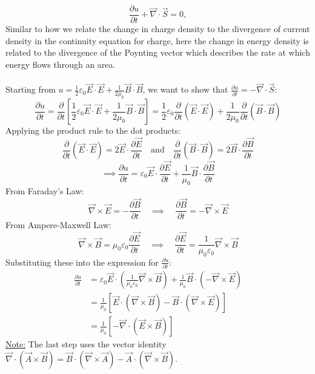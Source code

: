 \documentclass[12pt]{article}
\begin{document}
\[
\frac{\partial u}{\partial t} + \vec{\nabla} \cdot \vec{S} = 0,
\]
Similar to how we relate the change in charge density to the divergence of current density in the continuity equation for charge, here the change in energy density is related to the divergence of the Poynting vector which describes the rate at which energy flows through an area.\\\\
Starting from $u = \frac{1}{2} \varepsilon_0 \vec{E}\cdot\vec{E} + \frac{1}{2\mu_0} \vec{B}\cdot\vec{B}$, we want to show that $\frac{\partial u}{\partial t} =- \vec{\nabla} \cdot \vec{S}$:
\[
\frac{\partial u}{\partial t} = \frac{\partial}{\partial t} \left[\frac{1}{2} \varepsilon_0 \vec{E}\cdot\vec{E} + \frac{1}{2\mu_0} \vec{B}\cdot\vec{B}\right] = \frac{1}{2} \varepsilon_0 \frac{\partial}{\partial t}(\vec{E}\cdot\vec{E}) + \frac{1}{2\mu_0} \frac{\partial}{\partial t}(\vec{B}\cdot\vec{B}) 
\]
Applying the product rule to the dot products:
\[\frac{\partial}{\partial t}(\vec{E}\cdot\vec{E}) = 2\vec{E}\cdot\frac{\partial \vec{E}}{\partial t} \quad \text{and} \quad \frac{\partial}{\partial t}(\vec{B}\cdot\vec{B}) = 2\vec{B}\cdot\frac{\partial \vec{B}}{\partial t}\]
\[\implies \frac{\partial u}{\partial t} = \varepsilon_0 \vec{E}\cdot\frac{\partial \vec{E}}{\partial t} + \frac{1}{\mu_0} \vec{B}\cdot\frac{\partial \vec{B}}{\partial t}\]
From Faraday's Law:
\[\vec{\nabla} \times \vec{E} = -\frac{\partial \vec{B}}{\partial t} \quad\implies\quad \frac{\partial \vec{B}}{\partial t} = -\vec{\nabla} \times \vec{E}\]
From Ampere-Maxwell Law:
\[\vec{\nabla} \times \vec{B} = \mu_0 \varepsilon_0 \frac{\partial \vec{E}}{\partial t} \quad\implies\quad \frac{\partial \vec{E}}{\partial t} = \frac{1}{\mu_0 \varepsilon_0} \vec{\nabla} \times \vec{B}\]
Substituting these into the expression for $\frac{\partial u}{\partial t}$:
\[\begin{aligned}
\frac{\partial u}{\partial t} &= \varepsilon_0 \vec{E}\cdot\left(\frac{1}{\mu_0 \varepsilon_0} \vec{\nabla} \times \vec{B}\right) + \frac{1}{\mu_0} \vec{B}\cdot(-\vec{\nabla} \times \vec{E})\\
&= \frac{1}{\mu_0} \left[\vec{E}\cdot(\vec{\nabla} \times \vec{B}) - \vec{B}\cdot(\vec{\nabla} \times \vec{E})\right]\\
&= \frac{1}{\mu_0} \left[-\vec{\nabla} \cdot (\vec{E} \times \vec{B})\right]
\end{aligned}\]
\underline{Note:} The last step uses the vector identity $\vec{\nabla} \cdot (\vec{A} \times \vec{B}) = \vec{B}\cdot(\vec{\nabla} \times \vec{A}) - \vec{A}\cdot(\vec{\nabla} \times \vec{B})$.\\\\
\end{document}
